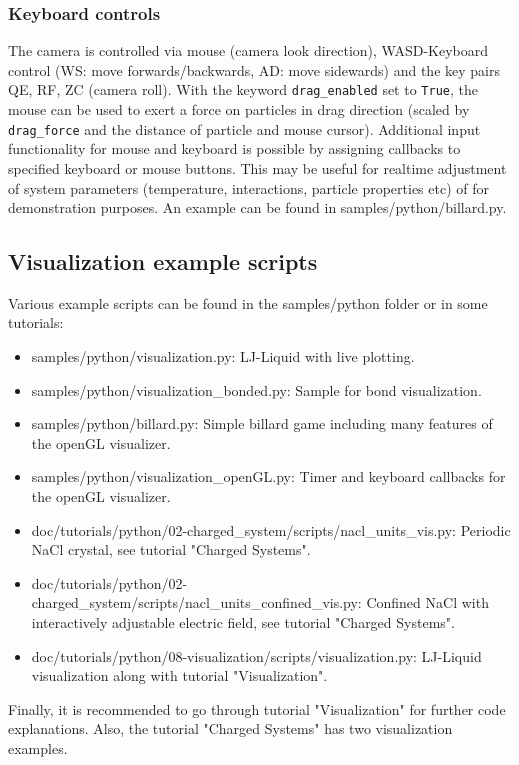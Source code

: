 \subsubsection{Keyboard controls}

The camera is controlled via mouse (camera look direction), WASD-Keyboard control
(WS: move forwards/backwards, AD: move sidewards) and the key pairs QE, RF, ZC (camera roll).
With the keyword \lstinline{drag_enabled} set to \lstinline{True}, the mouse can be
used to exert a force on particles in drag direction (scaled by
\lstinline{drag_force} and the distance of particle and mouse cursor).
Additional input functionality for mouse and keyboard is possible by assigning 
callbacks to specified keyboard or mouse buttons. This may be useful for realtime 
adjustment of system parameters (temperature, interactions, particle properties etc)
of for demonstration purposes. An example can be found in samples/python/billard.py.

\subsection{Visualization example scripts}

Various example scripts can be found in the samples/python folder or in some tutorials:

\begin{itemize}
\item samples/python/visualization.py: LJ-Liquid with live plotting.
\item samples/python/visualization_bonded.py: Sample for bond visualization.
\item samples/python/billard.py: Simple billard game including many features of the openGL visualizer.
\item samples/python/visualization_openGL.py: Timer and keyboard callbacks for the openGL visualizer.
\item doc/tutorials/python/02-charged_system/scripts/nacl_units_vis.py: Periodic NaCl crystal, see tutorial "Charged Systems".
\item doc/tutorials/python/02-charged_system/scripts/nacl_units_confined_vis.py: Confined NaCl with interactively adjustable electric field, see tutorial "Charged Systems".
\item doc/tutorials/python/08-visualization/scripts/visualization.py: LJ-Liquid visualization along with tutorial "Visualization".
\end{itemize}

Finally, it is recommended to go through tutorial "Visualization" for further code explanations. 
Also, the tutorial "Charged Systems" has two visualization examples.

